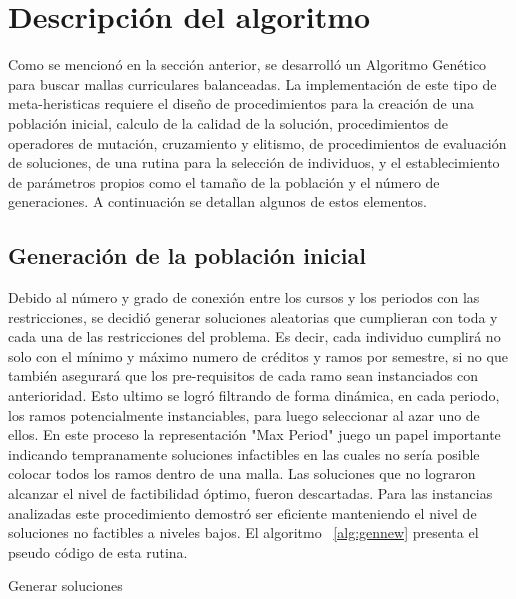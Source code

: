\documentclass[letter, 10pt]{article}
\begin{document}
\section{Descripción del algoritmo}
Como se mencionó en la sección anterior, se desarrolló un Algoritmo Genético
para buscar mallas curriculares balanceadas.  La implementación de este tipo de
meta-heristicas requiere el diseño de procedimientos para la creación de una
población inicial, calculo de la calidad de la solución, procedimientos de
operadores de mutación, cruzamiento y elitismo, de procedimientos de evaluación
de soluciones, de una rutina para la selección de individuos, y el
establecimiento de parámetros propios como el tamaño de la población y el número
de generaciones.  A continuación se detallan algunos de estos elementos.

\subsection{Generación de la población inicial}
Debido al número y grado de conexión entre los cursos y los periodos con las
restricciones, se decidió generar soluciones aleatorias que cumplieran con toda
y cada una de las restricciones del problema. Es decir, cada individuo cumplirá
no solo con el mínimo y máximo numero de créditos y ramos por semestre, si no
que también asegurará que los pre-requisitos de cada ramo sean instanciados con
anterioridad. Esto ultimo se logró filtrando de forma dinámica, en cada periodo,
los ramos potencialmente instanciables, para luego seleccionar al azar uno de
ellos. En este proceso la representación "Max Period" juego un papel importante
indicando tempranamente soluciones infactibles en las cuales no sería posible
colocar todos los ramos dentro de una malla. Las soluciones que no lograron
alcanzar el nivel de factibilidad óptimo, fueron descartadas. Para las
instancias analizadas este procedimiento demostró ser eficiente manteniendo el
nivel de soluciones no factibles a niveles bajos. El algoritmo ~\ref{alg:gennew}
presenta el pseudo código de esta rutina.

\begin{algorithm}[H]
\SetLine
{}
\caption{Generar soluciones}
\label{alg:gennew}
\end{algorithm}
\end{document}
